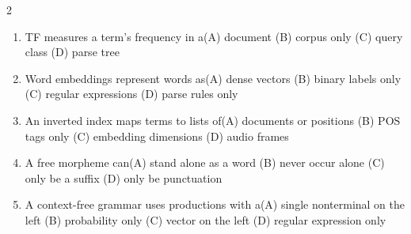 \documentclass[a4paper]{article}
\begin{document}
\begin{multicols*}{2}
\begin{enumerate}[resume]
\item TF measures a term's frequency in a\newline\hspace*{0.6em}(A) document \quad (B) corpus only \newline\hspace*{0.6em}(C) query class \quad (D) parse tree
\item Word embeddings represent words as\newline\hspace*{0.6em}(A) dense vectors \quad (B) binary labels only \newline\hspace*{0.6em}(C) regular expressions \quad (D) parse rules only
\item An inverted index maps terms to lists of\newline\hspace*{0.6em}(A) documents or positions \quad (B) POS tags only \newline\hspace*{0.6em}(C) embedding dimensions \quad (D) audio frames
\item A free morpheme can\newline\hspace*{0.6em}(A) stand alone as a word \quad (B) never occur alone \newline\hspace*{0.6em}(C) only be a suffix \quad (D) only be punctuation
\item A context-free grammar uses productions with a\newline\hspace*{0.6em}(A) single nonterminal on the left \quad (B) probability only \newline\hspace*{0.6em}(C) vector on the left \quad (D) regular expression only
\end{enumerate}
\end{multicols*}
\end{document}

